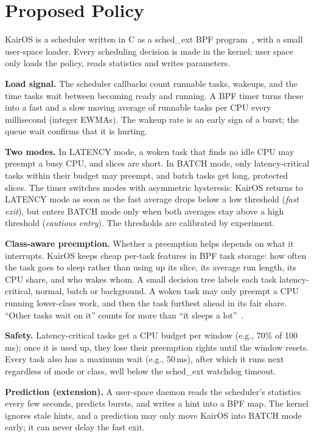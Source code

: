 \documentclass[letterpaper,twocolumn,10pt]{article}
\begin{document}
\section{Proposed Policy}

KairOS is a scheduler written in C as a sched\_ext BPF
program~\cite{schedext}, with a small user-space loader. Every scheduling
decision is made in the kernel; user space only loads the policy, reads
statistics and writes parameters.

\textbf{Load signal.} The scheduler callbacks count runnable tasks, wakeups,
and the time tasks wait between becoming ready and running. A BPF timer
turns these into a fast and a slow moving average of runnable tasks per CPU
every millisecond (integer EWMAs). The wakeup rate is an early sign of a
burst; the queue wait confirms that it is hurting.

\textbf{Two modes.} In LATENCY mode, a woken task that finds no idle CPU may
preempt a busy CPU, and slices are short. In BATCH mode, only
latency-critical tasks within their budget may preempt, and batch tasks get
long, protected slices. The timer switches modes with asymmetric hysteresis:
KairOS returns to LATENCY mode as soon as the fast average drops below a low
threshold (\emph{fast exit}), but enters BATCH mode only when both averages
stay above a high threshold (\emph{cautious entry}). The thresholds are
calibrated by experiment.

\textbf{Class-aware preemption.} Whether a preemption helps depends on what
it interrupts. KairOS keeps cheap per-task features in BPF task storage:
how often the task goes to sleep rather than using up its slice, its average
run length, its CPU share, and who wakes whom. A small decision tree labels
each task latency-critical, normal, batch or background. A woken task may
only preempt a CPU running lower-class work, and then the task furthest
ahead in its fair share. ``Other tasks wait on it'' counts for more than
``it sleeps a lot''~\cite{critstacks}.

\textbf{Safety.} Latency-critical tasks get a CPU budget per window (e.g.,
70\% of 100\,ms); once it is used up, they lose their preemption rights
until the window resets. Every task also has a maximum wait (e.g., 50\,ms),
after which it runs next regardless of mode or class, well below the
sched\_ext watchdog timeout.

\textbf{Prediction (extension).} A user-space daemon reads the scheduler's
statistics every few seconds, predicts bursts, and writes a hint into a BPF
map. The kernel ignores stale hints, and a prediction may only move KairOS
into BATCH mode early; it can never delay the fast exit.
\end{document}
